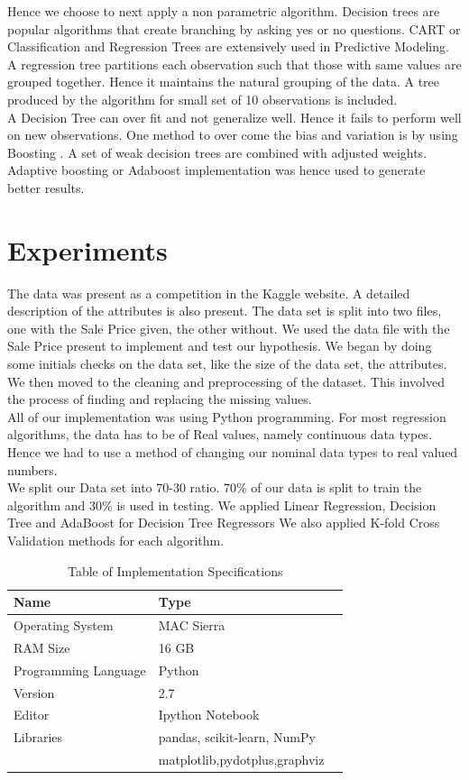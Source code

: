 \documentclass[fleqn,10pt]{SelfArx} %
\begin{document}
	Hence we choose to next apply a non parametric algorithm. Decision trees are popular algorithms that create branching by asking yes or no questions. CART or Classification and Regression Trees are extensively used in Predictive Modeling. A regression tree partitions each observation such that those with same values are grouped together. Hence it maintains the natural grouping of the data. A tree produced by the algorithm for small set of 10 observations is included. \\
	
	A Decision Tree can over fit and not generalize well. Hence it fails to perform well on new observations. One method to over come the bias and variation is by using Boosting \cite{dt}. A set of weak decision trees are combined with adjusted weights\cite{ada}. Adaptive boosting or Adaboost implementation was hence used to generate better results. 
	
	
	\section{Experiments}
	 The data was present as a competition in the Kaggle website\cite{kaggle}. A detailed description of the attributes is also present. The data set is split into two files, one with the Sale Price given, the other without. We used the data file with the Sale Price present to implement and test our hypothesis. We began by doing some initials checks on the data set, like the size of the data set, the attributes. We then moved to the cleaning and preprocessing of the dataset. This involved the process of finding and replacing the missing values. \\
	 
	 All of our implementation was using Python programming. For most regression algorithms, the data has to be of Real values, namely continuous data types. Hence we had to use a method of changing our nominal data types to real valued numbers\cite{dict}. \\
	 
	 We split our Data set into 70-30 ratio. 70\% of our data is split to train the algorithm and 30\% is used in testing. We applied Linear Regression, Decision Tree and AdaBoost for Decision Tree Regressors We also applied K-fold Cross Validation methods for each algorithm\cite{kfold}.
	
	\begin{table}[hbt]
		\caption{Table of Implementation Specifications}
		\centering
		\begin{tabular}{llr}
			\cmidrule(r){1-2}
			Name &  Type \\
			\midrule
			Operating System & MAC Sierra \\
			RAM Size & 16 GB\\
			Programming Language & Python \\
			Version & 2.7\\
			Editor & Ipython Notebook \\
			Libraries & pandas, scikit-learn, NumPy\\
			& matplotlib,pydotplus,graphviz 
		\end{tabular}
		\label{tab:label}
	\end{table}
	
\end{document}
